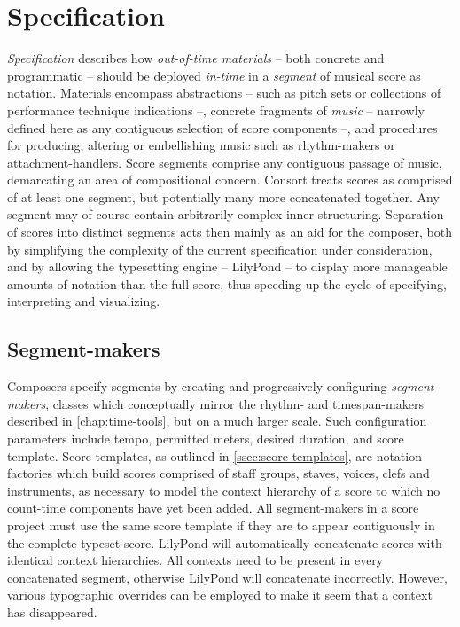 \section{Specification}
\label{sec:specification}

\emph{Specification} describes how \emph{out-of-time materials} -- both
concrete and programmatic -- should be deployed \emph{in-time} in a
\emph{segment} of musical score as notation. Materials encompass abstractions
-- such as pitch sets or collections of performance technique indications --,
concrete fragments of \emph{music} -- narrowly defined here as any contiguous
selection of score components --, and procedures for producing, altering or
embellishing music such as rhythm-makers or attachment-handlers. Score segments
comprise any contiguous passage of music, demarcating an area of compositional
concern. Consort treats scores as comprised of at least one segment, but
potentially many more concatenated together. Any segment may of course contain
arbitrarily complex inner structuring. Separation of scores into distinct
segments acts then mainly as an aid for the composer, both by simplifying the
complexity of the current specification under consideration, and by allowing
the typesetting engine -- LilyPond -- to display more manageable amounts of
notation than the full score, thus speeding up the cycle of specifying,
interpreting and visualizing.

\subsection{Segment-makers}
\label{ssec:segment-makers}

Composers specify segments by creating and progressively configuring
\emph{segment-makers}, classes which conceptually mirror the rhythm- and
timespan-makers described in \autoref{chap:time-tools}, but on a much larger
scale. Such configuration parameters include tempo, permitted meters, desired
duration, and score template. Score templates, as outlined in
\autoref{ssec:score-templates}, are notation factories which build scores
comprised of staff groups, staves, voices, clefs and instruments, as necessary
to model the context hierarchy of a score to which no count-time components
have yet been added. All segment-makers in a score project must use the same
score template if they are to appear contiguously in the complete typeset
score. LilyPond will automatically concatenate scores with identical context
hierarchies. All contexts need to be present in every concatenated segment,
otherwise LilyPond will concatenate incorrectly. However, various typographic
overrides can be employed to make it seem that a context has disappeared.

